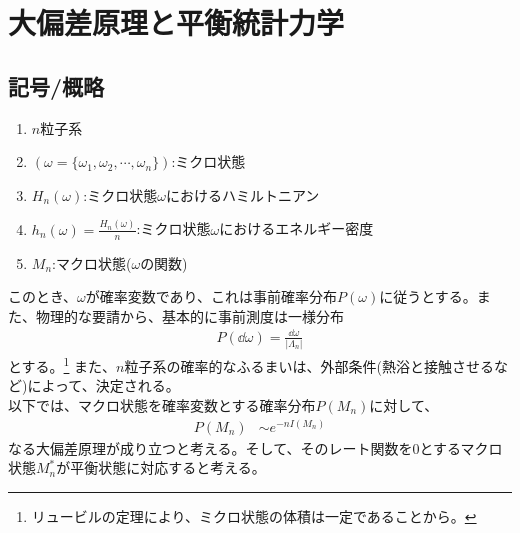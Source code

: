 \documentclass[a4paper,11pt]{jsarticle}
\numberwithin{equation}{section}
\begin{document}
\section{大偏差原理と平衡統計力学}
\subsection{記号/概略}
\begin{enumerate}
    \item $n$粒子系
    \item $(\omega = \{\omega_1, \omega_2, \cdots, \omega_n\})$:ミクロ状態
    \item $H_{n}(\omega)$:ミクロ状態$\omega$におけるハミルトニアン
    \item $h_{n}(\omega) = \frac{H_{n}(\omega)}{n}$:ミクロ状態$\omega$におけるエネルギー密度
    \item  $M_n$:マクロ状態($\omega$の関数)
\end{enumerate}
このとき、$\omega$が確率変数であり、これは事前確率分布$P(\omega)$に従うとする。また、物理的な要請から、基本的に事前測度は一様分布
\begin{align}
    P(\dd\omega) = \frac{\dd{\omega}}{|\Lambda_n|}
\end{align}
とする。\footnote{リュービルの定理により、ミクロ状態の体積は一定であることから。}
また、$n$粒子系の確率的なふるまいは、外部条件(熱浴と接触させるなど)によって、決定される。\\

以下では、マクロ状態を確率変数とする確率分布$P(M_n)$に対して、
\begin{align}
    P(M_n) &\sim e^{-nI(M_n)}
\end{align}
なる大偏差原理が成り立つと考える。そして、そのレート関数を$0$とするマクロ状態$M_{n}^{*}$が平衡状態に対応すると考える。
\end{document}
